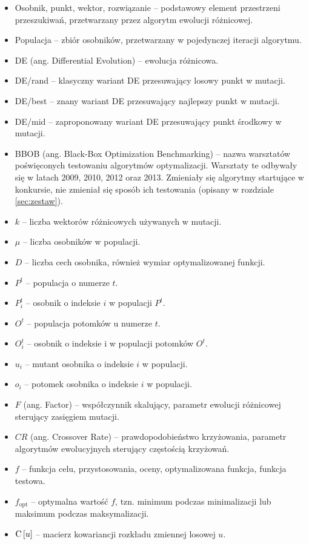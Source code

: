 \documentclass[a4paper,onecolumn,oneside,12pt,wide,floatssmall]{mwrep}
\def\C{{\rm C}\,}
\theoremstyle{definition}
\theoremstyle{plain}%
\theoremstyle{remark}
\begin{document}
\begin{itemize}
 \item[] Osobnik, punkt, wektor, rozwiązanie -- podstawowy element przestrzeni przeszukiwań, 
przetwarzany przez algorytm ewolucji różnicowej.
 \item[] Populacja -- zbiór osobników, przetwarzany w pojedynczej iteracji algorytmu.
 \item[] DE (ang. Differential Evolution) -- ewolucja różnicowa.
 \item[] DE/rand -- klasyczny wariant DE przesuwający losowy punkt w mutacji.
 \item[] DE/best -- znany wariant DE przesuwający najlepszy punkt w mutacji.
 \item[] DE/mid -- zaproponowany wariant DE przesuwający punkt środkowy w mutacji.
 \item[] BBOB (ang. Black-Box Optimization Benchmarking) -- nazwa warsztatów poświęconych testowaniu algorytmów optymalizacji. 
Warsztaty te odbywały się w latach 2009, 2010, 2012 oraz 2013. Zmieniały się algorytmy startujące w konkursie, nie zmieniał
się sposób ich testowania (opisany w rozdziale \ref{sec:zestaw}).
 \item[] $k$ -- liczba wektorów różnicowych używanych w mutacji.
 \item[] $\mu$ -- liczba osobników w populacji.
 \item[] $D$ -- liczba cech osobnika, również wymiar optymalizowanej funkcji.
 \item[] $P^t$ -- populacja o numerze $t$.
 \item[] $P_i^t$ -- osobnik o indeksie $i$ w populacji $P^t$.
 \item[] $O^t$ -- populacja potomków u numerze $t$.
 \item[] $O_i^t$ -- osobnik o indeksie i w populacji potomków $O^t$.
 \item[] $u_i$ -- mutant osobnika o indeksie $i$ w populacji.
 \item[] $o_i$ -- potomek osobnika o indeksie $i$ w populacji.
 \item[] $F$ (ang. Factor) -- współczynnik skalujący, parametr ewolucji różnicowej sterujący zasięgiem mutacji.
 \item[] $CR$ (ang. Crossover Rate) -- prawdopodobieństwo krzyżowania, parametr algorytmów ewolucyjnych sterujący częstością krzyżowań.
 \item[] $f$ -- funkcja celu, przystosowania, oceny, optymalizowana funkcja, funkcja testowa.
 \item[] $f_\text{opt}$ -- optymalna wartość $f$, tzn. minimum podczas minimalizacji lub maksimum podczas maksymalizacji.
 \item[] $\C[u]$ -- macierz kowariancji rozkładu zmiennej losowej $u$.
\end{itemize}
\end{document}
